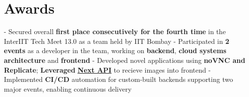 \documentclass[a4paper,10pt]{extarticle} %
\begin{document}
\section{\textcolor{primary}{Awards}}
 \vspace{0.1cm}
\begin{description}[style=nextline, font=$\bullet$\hspace{2mm}\normalsize]

 \item[{\href{https://interiit-tech.com/}{InterIIT Tech Meet 13.0}} | Contingent Gold ] 
- Secured overall \textbf{first place consecutively for the fourth time} in the InterIIT Tech Meet 13.0 as a team held by IIT Bombay \newline
- Participated in \textbf{2 events} as a developer in the team, working on \textbf{backend}, \textbf{cloud systems architecture} and \textbf{frontend} \newline
- Developed novel applications using \textbf{noVNC and Replicate}; \textbf{Leveraged} \href{https://nextjs.org/docs/pages/building-your-application/routing/api-routes}{\textbf{Next API}} to recieve images into frontend \newline
- Implemented \textbf{CI/CD} automation for custom-built backends supporting two major events, enabling continuous delivery
\end{description}

 \vspace{-0.1cm}
\end{document}
